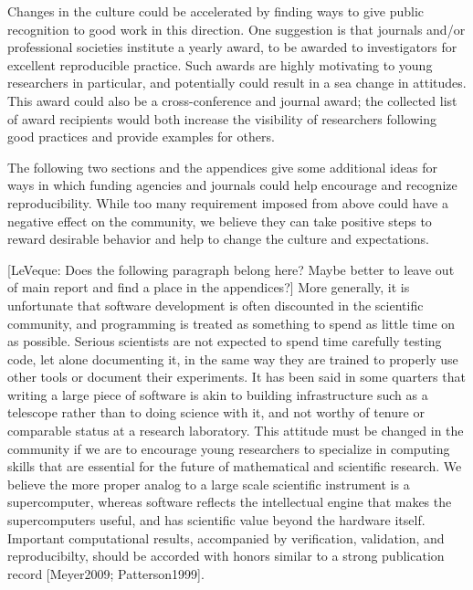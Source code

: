 \documentclass[11pt]{article}
\newcommand{\comment}[1]{{\color{blue} [#1]}}
\newcommand{\comment}[1]{}
\begin{document}
Changes in the culture could be accelerated by finding ways to give public
recognition to good work in this direction.  
One suggestion is that journals and/or professional societies institute a
yearly award, to be awarded to investigators for excellent reproducible
practice.  Such awards are highly motivating to young researchers in
particular, and potentially could result in a sea change in attitudes. This
award could also be a cross-conference and journal award; the collected list
of award recipients would both increase the visibility of researchers
following good practices and provide examples for others.

The following two sections and the appendices give some additional 
ideas for ways in which funding agencies and journals could help encourage
and recognize reproducibility.  While too many requirement imposed from
above could have a negative effect on the community, we believe they can
take positive steps to reward desirable behavior and help to change the
culture and expectations.

\comment{LeVeque:  Does the following paragraph belong here? Maybe better to
leave out of main report and find a place in the appendices?}
More generally, it is unfortunate that software development is often
discounted in the scientific community, and programming is treated
as something to spend as little time on as possible.  Serious
scientists are not expected to spend time carefully testing code,
let alone documenting it, in the same way they are trained to
properly use other tools or document their experiments.  It has
been said in some quarters that writing a large piece of software
is akin to building infrastructure such as a telescope rather than
to doing science with it, and not worthy of tenure or comparable
status at a research laboratory.  This attitude must be changed in
the community if we are to encourage young researchers to specialize
in computing skills that are essential for the future of mathematical
and scientific research.  We believe the more proper analog to a
large scale scientific instrument is a supercomputer,  whereas
software reflects the intellectual engine that makes the supercomputers
useful, and has scientific value beyond the hardware itself.
Important computational results, accompanied by verification,
validation, and reproducibilty, should be accorded with honors
similar to a strong publication record [Meyer2009; Patterson1999].
\end{document}
